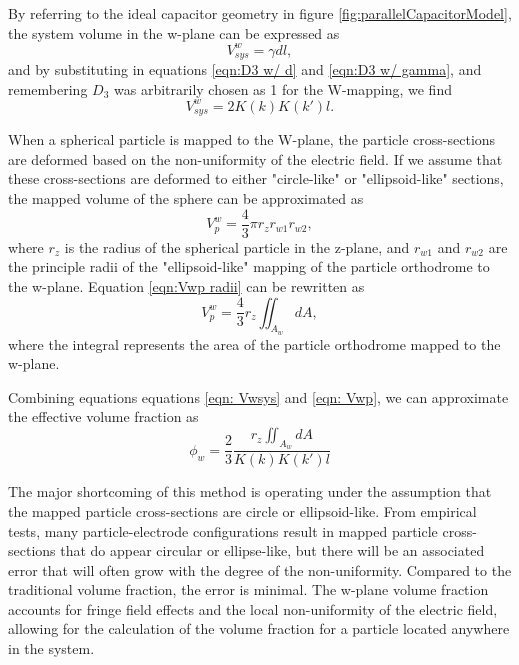 \par By referring to the ideal capacitor geometry in figure \ref{fig:parallelCapacitorModel}, the system volume in the w-plane can be expressed as 
\begin{equation}
    V^w_{sys} = \gamma d l,    
\end{equation}
\noindent and by substituting in equations \ref{eqn:D3 w/ d} and \ref{eqn:D3 w/ gamma}, and remembering $D_3$ was arbitrarily chosen as 1 for the W-mapping, we find
\begin{equation}
    V^w_{sys} = 2K(k)K(k')l.
    \label{eqn: Vwsys}
\end{equation}
\par When a spherical particle is mapped to the W-plane, the particle cross-sections are deformed based on the non-uniformity of the electric field. If we assume that these cross-sections are deformed to either "circle-like" or "ellipsoid-like" sections, the mapped volume of the sphere can be approximated as 
\begin{equation}
    V^w_p = \frac{4}{3}\pi r_z r_{w1} r_{w2},
    \label{eqn:Vwp radii}
\end{equation}
\noindent where $r_z$ is the radius of the spherical particle in the z-plane, and $r_{w1}$ and $r_{w2}$ are the principle radii of the "ellipsoid-like" mapping of the particle orthodrome to the w-plane. Equation \ref{eqn:Vwp radii} can be rewritten as 
\begin{equation}
    V^w_p = \frac{4}{3} r_z \iint_{A_w} dA,
    \label{eqn: Vwp}
\end{equation}
\noindent where the integral represents the area of the particle orthodrome mapped to the w-plane. 

\par Combining equations equations \ref{eqn: Vwsys} and \ref{eqn: Vwp}, we can approximate the effective volume fraction as
\begin{equation}
    \phi_w = \frac{2}{3} \frac{r_z \iint_{A_w} dA}{K(k)K(k')l}
\end{equation}

\par The major shortcoming of this method is operating under the assumption that the mapped particle cross-sections are circle or ellipsoid-like. From empirical tests, many particle-electrode configurations result in mapped particle cross-sections that do appear circular or ellipse-like, but there will be an associated error that will often grow with the degree of the non-uniformity. Compared to the traditional volume fraction, the error is minimal. The w-plane volume fraction accounts for fringe field effects and the local non-uniformity of the electric field, allowing for the calculation of the volume fraction for a particle located anywhere in the system. 

